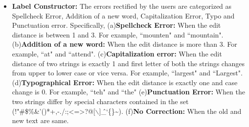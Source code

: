 \documentclass[letterpaper]{article}
\begin{document}
\begin{enumerate}
\begin{itemize}
%
\item \textbf{Label Constructor: }The errors rectified by the users are categorized as Spellcheck Error, Addition of a new word, Capitalization Error, Typo and Punctuation error. 
Specifically,
(a)\textbf{Spellcheck Error: }When the edit distance is between 1 and 3. For example, ``mounten" and ``mountain".
(b)\textbf{Addition of a new word: }When the edit distance is more than 3. For example, ``at" and ``attend".
(c)\textbf{Capitalization error: } When the edit distance of two strings is exactly 1 and first letter of both the strings changes from upper to lower case or vice versa. For example, ``largest" and ``Largest".
(d)\textbf{Typographical Error: } When the edit distance is exactly one and case change is 0. For example, ``teh" and ``the"
(e)\textbf{Punctuation Error: }When the two strings differ by special characters contained in the set (!"\#\$\%\&'()*+,-./:;\textless=\textgreater?@[$\backslash$]\^\_`\{\textbar\}\textasciitilde). 
(f)\textbf{No Correction: }When the old and new text are same. %


\end{itemize}
\end{enumerate}
\end{document}
